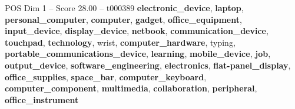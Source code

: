 \begin{textsample}{POS Dim 1 – Score 28.00 – t000389}  \label{ex:f1_pos_021}
\textbf{electronic\_device}, \textbf{laptop}, \textbf{personal\_computer}, \textbf{computer}, \textbf{gadget}, \textbf{office\_equipment}, \textbf{input\_device}, \textbf{display\_device}, \textbf{netbook}, \textbf{communication\_device}, \textbf{touchpad}, \textbf{technology}, wrist, \textbf{computer\_hardware}, typing, \textbf{portable\_communications\_device}, \textbf{learning}, \textbf{mobile\_device}, \textbf{job}, \textbf{output\_device}, \textbf{software\_engineering}, \textbf{electronics}, \textbf{flat-panel\_display}, \textbf{office\_supplies}, \textbf{space\_bar}, \textbf{computer\_keyboard}, \textbf{computer\_component}, \textbf{multimedia}, \textbf{collaboration}, \textbf{peripheral}, \textbf{office\_instrument}

\end{textsample}
